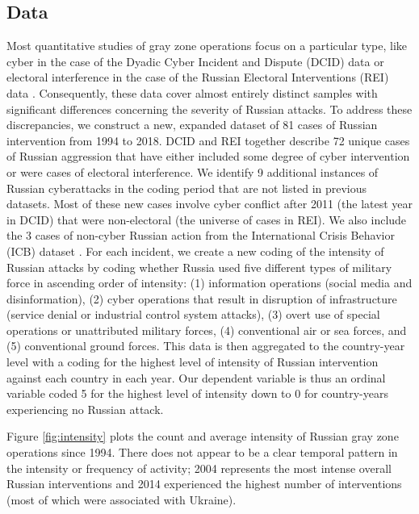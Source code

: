 \documentclass[11pt,letterpaper,pdftex,dvipsnames,table]{article}
\begin{document}
\subsection{Data}
Most quantitative studies of gray zone operations focus on a particular type, like cyber in the case of the Dyadic Cyber Incident and Dispute (DCID) data or electoral interference in the case of the Russian Electoral Interventions (REI) data \citep{valeriano_dynamicscyberconflict_2014, casey_russianelectoralinterventions_2017}. Consequently, these data cover almost entirely distinct samples with significant differences concerning the severity of Russian attacks. To address these discrepancies, we construct a new, expanded dataset of 81 cases of Russian intervention from 1994 to 2018. DCID and REI together describe 72 unique cases of Russian aggression that have either included some degree of cyber intervention or were cases of electoral interference. We identify 9 additional instances of Russian cyberattacks in the coding period that are not listed in previous datasets. Most of these new cases involve cyber conflict after 2011 (the latest year in DCID) that were non-electoral (the universe of cases in REI). We also include the 3 cases of non-cyber Russian action from the International Crisis Behavior (ICB) dataset \citep{brecher_studycrisis_1997}. For each incident, we create a new coding of the intensity of Russian attacks by coding whether Russia used five different types of military force in ascending order of intensity: (1) information operations (social media and disinformation), (2) cyber operations that result in disruption of infrastructure (service denial or industrial control system attacks), (3) overt use of special operations or unattributed military forces, (4) conventional air or sea forces, and (5) conventional ground forces. This data is then aggregated to the country-year level with a coding for the highest level of intensity of Russian intervention against each country in each year. Our dependent variable is thus an ordinal variable coded 5 for the highest level of intensity down to 0 for country-years experiencing no Russian attack.

Figure \ref{fig:intensity} plots the count and average intensity of Russian gray zone operations since 1994. There does not appear to be a clear temporal pattern in the intensity or frequency of activity; 2004 represents the most intense overall Russian interventions and 2014 experienced the highest number of interventions (most of which were associated with Ukraine).
\end{document}

